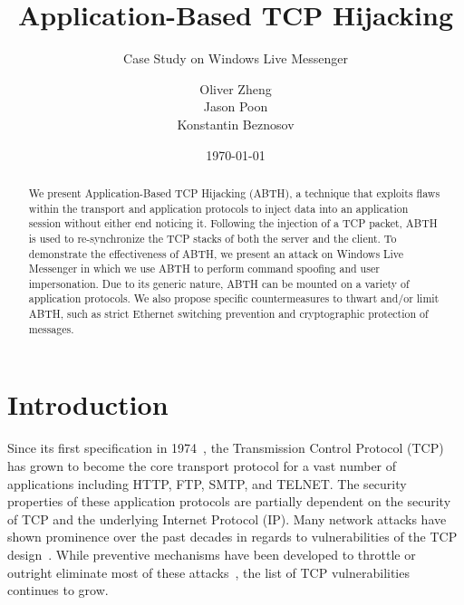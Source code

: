 \documentclass{sig-alternate}
\begin{document}

\title{
Application-Based TCP Hijacking
}
\subtitle{Case Study on Windows Live Messenger}

\author {
	\alignauthor
	Oliver Zheng\\
	\alignauthor
	Jason Poon\\
	\alignauthor
	Konstantin Beznosov\\
}

\date{\today}

\maketitle

\begin{abstract}
We present Application-Based TCP Hijacking (ABTH), a technique that exploits flaws within the transport and application protocols to inject data into an application session without either end noticing it. Following the injection of a TCP packet, ABTH is used to re-synchronize the TCP stacks of both the server and the client. To demonstrate the effectiveness of ABTH, we present an attack on Windows Live Messenger in which we use ABTH to perform command spoofing and user impersonation. Due to its generic nature, ABTH can be mounted on a variety of application protocols. We also propose specific countermeasures to thwart and/or limit ABTH, such as strict Ethernet switching prevention and cryptographic protection of messages.
\end{abstract}



\section{Introduction}

Since its first specification in 1974~\cite{rfc:tcp}, the Transmission Control Protocol (TCP) has grown to become the core transport protocol for a vast number of applications including HTTP, FTP, SMTP, and TELNET. The security properties of these application protocols are partially dependent on the security of TCP and the underlying Internet Protocol (IP). Many network attacks have shown prominence over the past decades in regards to vulnerabilities of the TCP design~\cite{harris:tcpattacks}. While preventive mechanisms have been developed to throttle or outright eliminate most of these attacks~\cite{dubrawsky:layer2}, the list of TCP vulnerabilities continues to grow. 
\end{document}
